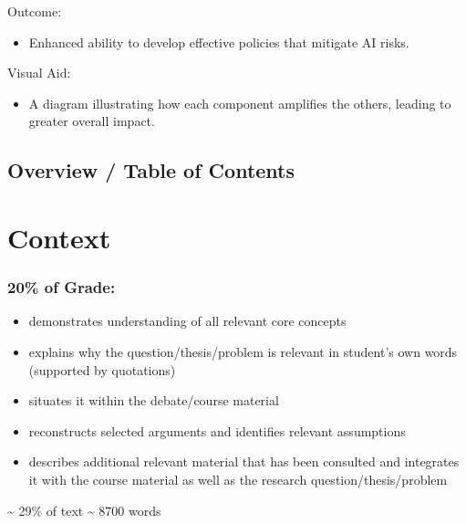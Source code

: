 \documentclass[
  letterpaper,
]{book}
\providecommand{\tightlist}{%
  \setlength{\itemsep}{0pt}\setlength{\parskip}{0pt}}
\begin{document}
Outcome:

\begin{itemize}
\tightlist
\item
  Enhanced ability to develop effective policies that mitigate AI risks.
\end{itemize}

Visual Aid:

\begin{itemize}
\tightlist
\item
  A diagram illustrating how each component amplifies the others,
  leading to greater overall impact.
\end{itemize}

\section{}\label{section-1}

\section{Overview / Table of Contents}\label{overview-table-of-contents}


\chapter{Context}\label{context}

\subsection{20\% of Grade:}\label{of-grade}

\begin{itemize}
\item
  demonstrates understanding of all relevant core concepts
\item
  explains why the question/thesis/problem is relevant in student's own
  words (supported by quotations)
\item
  situates it within the debate/course material
\item
  reconstructs selected arguments and identifies relevant assumptions
\item
  describes additional relevant material that has been consulted and
  integrates it with the course material as well as the research
  question/thesis/problem
\end{itemize}

\textasciitilde{} 29\% of text \textasciitilde{} 8700 words
\end{document}
